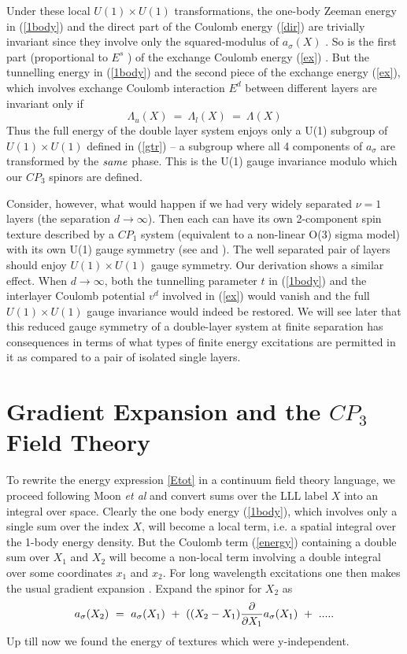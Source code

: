 Under these local $U(1) \times U(1)$ transformations, the one-body
Zeeman energy in (\ref{1body}) and the direct part of the Coulomb energy
(\ref{dir}) are trivially invariant since they involve only the
squared-modulus
of $a_{\sigma}(X)$ . So is the first part (proportional to $E^{s}$ )
of the exchange Coulomb energy (\ref{ex}) . But the tunnelling energy in
(\ref{1body}) and the second piece of the exchange energy (\ref{ex}),
which involves exchange Coulomb interaction $E^{d}$ between different layers 
are invariant only if 
\begin{equation} \Lambda_{u}(X) \ = \ \Lambda_{l}(X) \ = \ \Lambda (X) \end{equation} 
Thus the full energy of the double layer system enjoys only a 
U(1) subgroup of $U(1) \times U(1)$ defined in (\ref{gtr}) -- 
a subgroup where all 4 components of $a_{\sigma}$ are transformed by the 
$\it{same}$ phase. This is the U(1) gauge invariance 
modulo which our $CP_3$ spinors are defined. 

Consider, however, what would happen if we had 
very widely separated $\nu = 1$ layers 
(the separation $d \rightarrow \infty$).
Then each can have its own 2-component spin texture 
described by a $CP_1$ system 
(equivalent to a non-linear O(3) sigma model) with its own U(1) 
gauge symmetry (see \cite{GirvMac} and \cite{Raj}). 
The well separated pair of layers should enjoy $U(1) \times U(1)$
gauge symmetry. Our derivation shows a similar effect. When 
$d \rightarrow \infty$, 
both the tunnelling parameter $t$ in (\ref{1body}) and the interlayer 
Coulomb potential $v^{d}$ involved in (\ref{ex}) 
would vanish and the full $U(1) \times U(1)$ gauge invariance would 
indeed be restored. 
We will see later that this reduced gauge symmetry of a double-layer system
at finite separation has consequences in terms of what types of finite 
energy excitations are permitted in it as compared 
to a pair of isolated single layers.

\section{Gradient Expansion and the $CP_3$ Field Theory}

To rewrite the energy expression \ref{Etot} in a continuum field theory
language, we proceed following Moon {\sl et al} \cite{Moon} and convert
sums over the LLL label $X$ into an integral over space.
Clearly the one body energy (\ref{1body}), which involves only a single sum
over the index $X$, will become a local term, i.e. a spatial integral over
the 1-body energy density. But the Coulomb term (\ref{energy}) containing 
a double sum over
$X_{1}$ and $X_{2}$ will become a non-local term involving a double integral
over some coordinates $x_{1}$ and $x_{2}$. For long wavelength
excitations one then makes the usual gradient expansion . Expand the spinor
for $X_2$ as
\begin{equation} a_{\sigma}(X_{2}) \ = \  a_{\sigma}(X_{1}) \ + \ ((X_{2}-X_{1})
{\partial \over \partial X_{1}} a_{\sigma}(X_{1}) \ + \ ..\label{grad}... \end{equation}
Up till now we found the energy of textures which were y-independent.

